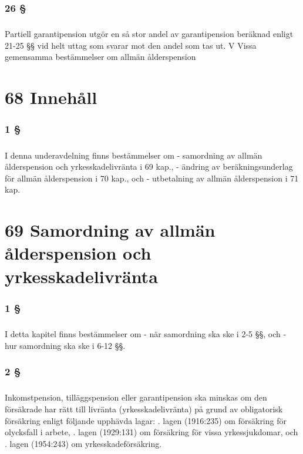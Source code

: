 \documentclass[a4paper,notitlepage,openany,10pt]{book}
\begin{document}
\subsection*{26 §}
\paragraph*{}
Partiell garantipension utgör en så stor andel av garantipension beräknad enligt 21-25 §§ vid helt uttag som svarar mot den andel som tas ut.
V Vissa gemensamma bestämmelser om allmän ålderspension
\chapter*{68 Innehåll}
\subsection*{1 §}
\paragraph*{}
I denna underavdelning finns bestämmelser om
\newline - samordning av allmän ålderspension och yrkesskadelivränta i 69 kap.,
\newline - ändring av beräkningsunderlag för allmän ålderspension i 70 kap., och
\newline - utbetalning av allmän ålderspension i 71 kap.
\chapter*{69 Samordning av allmän ålderspension och yrkesskadelivränta}
\subsection*{1 §}
\paragraph*{}
I detta kapitel finns bestämmelser om
\newline - när samordning ska ske i 2-5 §§, och
\newline - hur samordning ska ske i 6-12 §§.
\subsection*{2 §}
\paragraph*{}
Inkomstpension, tilläggspension eller garantipension ska minskas om den försäkrade har rätt till livränta (yrkesskadelivränta) på grund av obligatorisk försäkring enligt följande upphävda lagar:
. lagen (1916:235) om försäkring för olycksfall i arbete,
. lagen (1929:131) om försäkring för vissa yrkessjukdomar, och
. lagen (1954:243) om yrkesskadeförsäkring.
\end{document}

